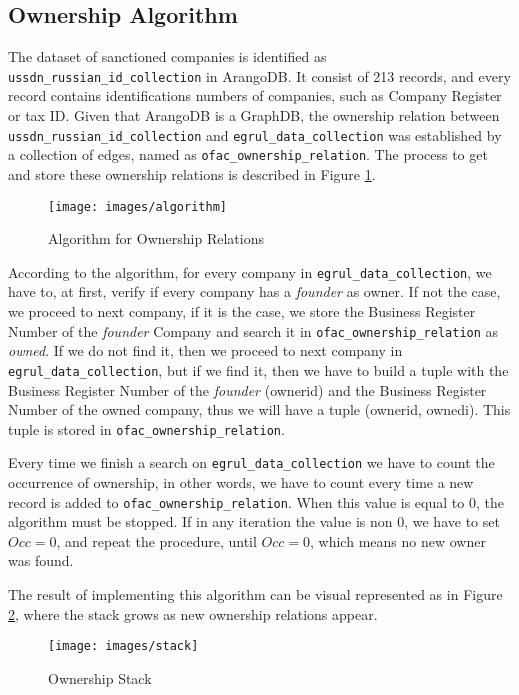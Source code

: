 \begin{spacing}{1.5}
	
\section{Ownership Algorithm}\label{ownership}
	
	 The dataset of sanctioned companies is identified as \texttt{ussdn\_russian\_id\_collection} in ArangoDB. It consist of 213 records, and every record contains identifications numbers of companies, such as Company Register or tax ID. Given that ArangoDB is a GraphDB, the ownership relation between \texttt{ussdn\_russian\_id\_collection} and \texttt{egrul\_data\_collection} was established by a collection of edges, named as \texttt{ofac\_ownership\_relation}. The process to get and store these ownership relations is described in Figure \ref{figure3}. 
	 
	 
	 \begin{figure}
	 	\centering
	 \texttt{[image: images/algorithm]}
	 	\caption{Algorithm for Ownership Relations}\label{figure3}
	 \end{figure}

	According to the algorithm, for every company in \texttt{egrul\_data\_collection}, we have to, at first, verify if every company has a \textit{founder} as owner. If not the case, we proceed to next company, if it is the case, we store the Business Register Number of the \textit{founder} Company and search it in \texttt{ofac\_ownership\_relation} as \textit{owned}.  If we do not find it, then we proceed to next company in \texttt{egrul\_data\_collection}, but if we find it, then we have to build a tuple with the Business Register Number of the \textit{founder} (ownerid) and the Business Register Number of the owned company, thus we will have a tuple (ownerid, ownedi). This tuple is stored in \texttt{ofac\_ownership\_relation}. 
	
	Every time we finish a search on \texttt{egrul\_data\_collection} we have to count the occurrence of ownership, in other words, we have to count every time a new record is added to \texttt{ofac\_ownership\_relation}. When this value is equal to 0, the algorithm must be stopped. If in any iteration the value is non $0$, we have to set $Occ = 0$, and repeat the procedure, until $Occ =0$, which means no new owner was found. 
		
	The result of implementing this algorithm can be visual represented as in Figure \ref{figure4}, where the stack grows as new ownership relations appear. 
	
	\begin{figure}
		\centering
	\texttt{[image: images/stack]}
		\caption{Ownership Stack}\label{figure4}
	\end{figure}
	

\end{spacing}
